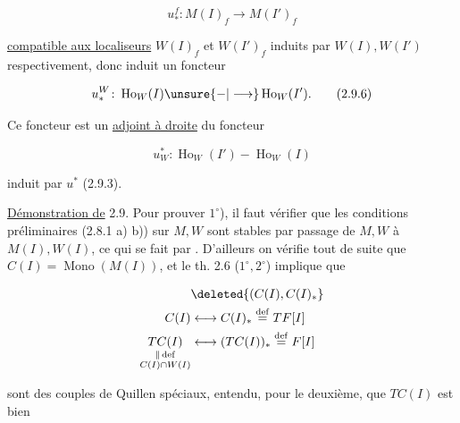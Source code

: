 
\[
 u_*^f\colon M(I)_f\longrightarrow M(I')_f\tag*{(2.9.5)}
\]


\uline{compatible aux localiseurs} $W(I)_f$ et $W(I')_f$
induits par $W(I),W(I')$ respectivement, donc
induit un foncteur

\[
 u_*^W\colon\operatorname{Ho}_W(I)\unsure{-|\longrightarrow}\operatorname{Ho}_W(I').\tag*{(2.9.6)}
\]

Ce foncteur est un \uline{adjoint à droite} du
foncteur 

\[
 u^*_W\colon\operatorname{Ho}_W(I')\mathrel{-}\operatorname{Ho}_W(I)\tag*{(2.9.7.)}
\]

induit par $u^*$ (2.9.3).

\uline{Démonstration de} 2.9. Pour prouver $1^\circ$),
il faut vérifier  que les conditions préliminaires
(2.8.1 a) b)) sur $M,W$ sont stables
par passage de $M,W$ à $M(I),W(I)$, ce
qui se fait par . 
 D'ailleurs on vérifie tout de suite que
 $C(I)=\operatorname{Mono}(M(I))$,
et le th. 2.6 ($1^\circ,2^\circ$) implique  que

\[
\begin{aligned}
 &\deleted{(C(I),C(I)_*}\\
 C(I)&\longleftrightarrow C(I)_*\overset{\mathrm{def}}{=}TF[I]\\
 \underset{\substack{\|\,\mathrm{def}\\ C(I)\cap W(I)}}{TC(I)}
 &\longleftrightarrow(TC(I))_*\overset{\mathrm{def}}{=}F[I]
\end{aligned}
\]

sont des couples de Quillen spéciaux, 
entendu, pour le deuxième, que $TC(I)$ est bien
